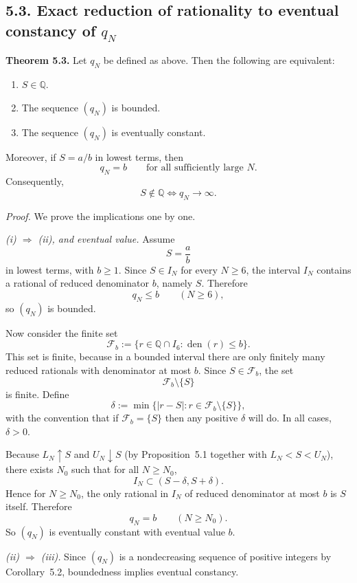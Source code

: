 \subsection*{5.3. Exact reduction of rationality to eventual constancy of \(q_N\)}

\medskip
\noindent\textbf{Theorem 5.3.}
Let \(q_N\) be defined as above. Then the following are equivalent:
\begin{enumerate}
\item[(i)] \(S\in\mathbb Q\).
\item[(ii)] The sequence \((q_N)\) is bounded.
\item[(iii)] The sequence \((q_N)\) is eventually constant.
\end{enumerate}
Moreover, if \(S=a/b\) in lowest terms, then
\[
q_N=b
\qquad\text{for all sufficiently large }N.
\]
Consequently,
\[
S\notin\mathbb Q
\iff
q_N\to\infty.
\]

\emph{Proof.}
We prove the implications one by one.

\smallskip
\noindent\emph{(i) \(\Rightarrow\) (ii), and eventual value.}
Assume
\[
S=\frac ab
\]
in lowest terms, with \(b\ge 1\). Since \(S\in I_N\) for every \(N\ge 6\), the interval \(I_N\) contains a rational of reduced denominator \(b\), namely \(S\). Therefore
\[
q_N\le b
\qquad (N\ge 6),
\]
so \((q_N)\) is bounded.

Now consider the finite set
\[
\mathcal F_b:=\{r\in \mathbb Q\cap I_6 : \operatorname{den}(r)\le b\}.
\]
This set is finite, because in a bounded interval there are only finitely many reduced rationals with denominator at most \(b\). Since \(S\in\mathcal F_b\), the set
\[
\mathcal F_b\setminus\{S\}
\]
is finite. Define
\[
\delta:=\min\{|r-S| : r\in \mathcal F_b\setminus\{S\}\},
\]
with the convention that if \(\mathcal F_b=\{S\}\) then any positive \(\delta\) will do. In all cases, \(\delta>0\).

Because \(L_N\uparrow S\) and \(U_N\downarrow S\) (by Proposition~5.1 together with \(L_N<S<U_N\)), there exists \(N_0\) such that for all \(N\ge N_0\),
\[
I_N\subset (S-\delta,S+\delta).
\]
Hence for \(N\ge N_0\), the only rational in \(I_N\) of reduced denominator at most \(b\) is \(S\) itself. Therefore
\[
q_N=b
\qquad (N\ge N_0).
\]
So \((q_N)\) is eventually constant with eventual value \(b\).

\smallskip
\noindent\emph{(ii) \(\Rightarrow\) (iii).}
Since \((q_N)\) is a nondecreasing sequence of positive integers by Corollary~5.2, boundedness implies eventual constancy.

